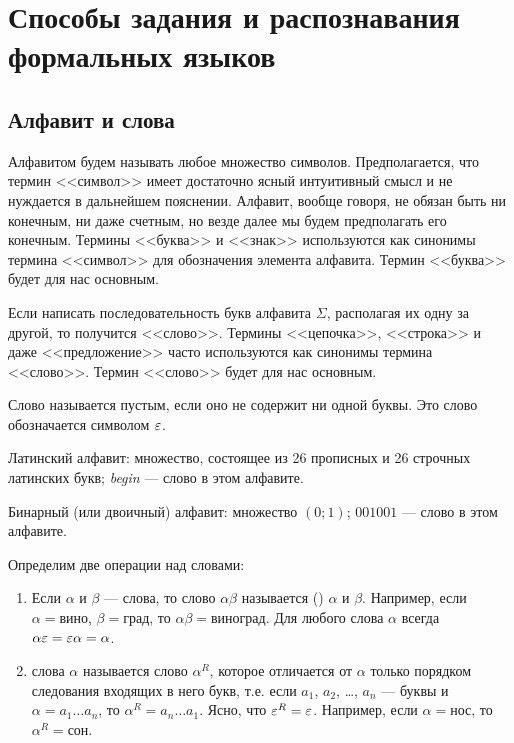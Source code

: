 \chapter{Способы задания и распознавания формальных языков}
\label{Chapter1}

\section{Алфавит и слова}
\label{Chapter1Alphabet}

Алфавитом будем называть любое множество символов. Предполагается,
что термин <<символ>> имеет достаточно ясный интуитивный смысл и не
нуждается в дальнейшем пояснении. Алфавит, вообще говоря, не обязан
быть ни конечным, ни даже счетным, но везде далее мы будем
предполагать его конечным. Термины <<буква>> и <<знак>> используются
как синонимы термина <<символ>> для обозначения элемента алфавита.
Термин <<буква>> будет для нас основным.

Если написать последовательность букв алфавита $\Sigma$, располагая их одну за другой, то получится <<слово>>. Термины <<цепочка>>, <<строка>> и даже <<предложение>> часто используются как синонимы термина <<слово>>. Термин <<слово>> будет для нас основным.

Слово называется пустым, если оно не содержит ни одной буквы. Это слово обозначается символом $\varepsilon$.

\begin{myexample}
Латинский алфавит: множество, состоящее из 26 прописных и 26 строчных латинских букв; \emph{begin} --- слово в этом алфавите.
\end{myexample}

\begin{myexample}
Бинарный (или двоичный) алфавит: множество $(0;1)$; $001001$ --- слово в этом алфавите.
\end{myexample}

Определим две операции над словами:

\begin{enumerate}%
    \item
Если $\alpha$ и $\beta$ --- слова, то слово $\alpha\beta$ называется  () $\alpha$ и $\beta$. Например, если $\alpha= \text{вино}$, $\beta=\text{град}$, то $\alpha\beta=\text{виноград}$. Для любого слова $\alpha$ всегда $\alpha\varepsilon=\varepsilon\alpha=\alpha$.

    \item
{} слова $\alpha$ называется слово $\alpha^R$, которое отличается от $\alpha$ только порядком следования входящих в него букв, т.е. если
 $a_1$, $a_2$, \ldots , $a_n$ --- буквы и $\alpha=a_1 \ldots a_n$, то $\alpha^R=a_n\ldots a_1$. Ясно, что
$\varepsilon^R=\varepsilon$. Например, если $\alpha= \text{нос}$, то $\alpha^R=\text{сон}$.
\end{enumerate}


